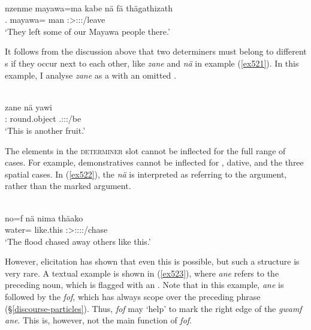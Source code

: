 \begin{exe}
	\\
	\gll nzenme mayawa=ma kabe nä fä thägathizath\\
	\Fnsg.{\Poss} mayawa={\Char} man {\Indf} {\Dist} \Stpl:\Sbj>\Stpl:\Obj:\Pst:\Ipfv/leave\\
	\trans `They left some of our Mayawa people there.'
	\label{ex553}
\end{exe}

It follows from the discussion above that two determiners must belong to different s if they occur next to each other, like \emph{zane} and \emph{nä} in example (\ref{ex521}). In this example, I analyse \emph{zane} as a  with an omitted .

\begin{exe}
	\\
	\gll zane nä yawi \\
	\Dem:{\Prox} {\Indf} {round.object} \Tsg.\Masc:\Sbj:\Nonpast:\Ipfv/be\\
	\trans `This is another fruit.'
	\label{ex521}
\end{exe}

The elements in the \textsc{determiner} slot cannot be inflected for the full range of cases. For example, demonstratives cannot be inflected for , dative,  and the three spatial cases. In (\ref{ex522}), the  \emph{nä} is interpreted as referring to the  argument, rather than the  marked argument.

\begin{exe}
	\\
	\gll no=f nä nima thäako\\
	water={\Erg} {\Indf} {like.this} \Sg:\Sbj>\Stpl:\Obj:\Pst:\Pfv:\Andat/chase\\
	\trans `The flood chased away others like this.'
	\label{ex522}
\end{exe}

However, elicitation has shown that even this is possible, but such a structure is very rare. A textual example is shown in (\ref{ex523}), where \emph{ane} refers to the preceding noun, which is flagged with an . Note that in this example, \emph{ane} is followed by the   \emph{fof}, which has always scope over the preceding phrase ({\S}\ref{discourse-particles}). Thus, \emph{fof} may `help' to mark the right edge of the  \emph{gwamf ane}. This is, however, not the main function of \emph{fof}.

